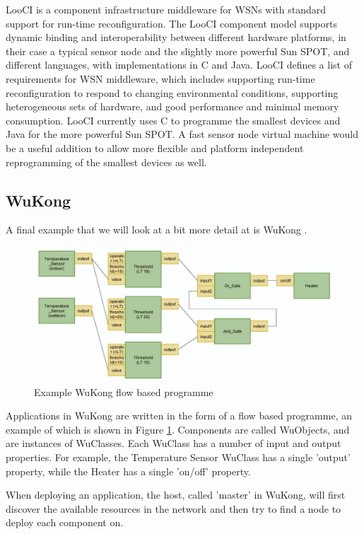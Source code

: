 LooCI \cite{Hughes:dg} is a component infrastructure middleware for WSNs with standard support for run-time reconfiguration. The LooCI component model supports dynamic binding and interoperability between different hardware platforms, in their case a typical sensor node and the slightly more powerful Sun SPOT, and different languages, with implementations in C and Java. LooCI defines a list of requirements for WSN middleware, which includes supporting run-time reconfiguration to respond to changing environmental conditions, supporting heterogeneous sets of hardware, and good performance and minimal memory consumption. LooCI currently uses C to programme the smallest devices and Java for the more powerful Sun SPOT. A fast sensor node virtual machine would be a useful addition to allow more flexible and platform independent reprogramming of the smallest devices as well.

\subsection{WuKong}
\label{sec-state-of-the-art-wukong}
A final example that we will look at a bit more detail at is WuKong \cite{Reijers:2013ut, Lin:2013dc}.


\begin{figure}
\centering
\includegraphics[width=0.8\linewidth]{wukong-fbp.png}
\caption{Example WuKong flow based programme}
\label{fig-wukong-fbp}
\end{figure}


Applications in WuKong are written in the form of a flow based programme, an example of which is shown in Figure \ref{fig-wukong-fbp}. Components are called WuObjects, and are instances of WuClasses. Each WuClass has a number of input and output properties. For example, the Temperature Sensor WuClass has a single 'output' property, while the Heater has a single 'on/off' property.

When deploying an application, the host, called 'master' in WuKong, will first discover the available resources in the network and then try to find a node to deploy each component on.

